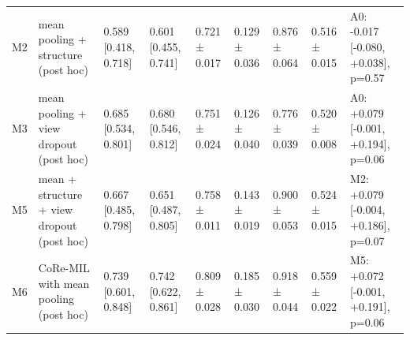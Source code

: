 \begin{table}
\begin{tabular}{lllllllll}
M2 & mean pooling + structure (post hoc) & 0.589 [0.418, 0.718] & 0.601 [0.455, 0.741] & 0.721 ± 0.017 & 0.129 ± 0.036 & 0.876 ± 0.064 & 0.516 ± 0.015 & A0: -0.017 [-0.080, +0.038], p=0.57 \\
M3 & mean pooling + view dropout (post hoc) & 0.685 [0.534, 0.801] & 0.680 [0.546, 0.812] & 0.751 ± 0.024 & 0.126 ± 0.040 & 0.776 ± 0.039 & 0.520 ± 0.008 & A0: +0.079 [-0.001, +0.194], p=0.06 \\
M5 & mean + structure + view dropout (post hoc) & 0.667 [0.485, 0.798] & 0.651 [0.487, 0.805] & 0.758 ± 0.011 & 0.143 ± 0.019 & 0.900 ± 0.053 & 0.524 ± 0.015 & M2: +0.079 [-0.004, +0.186], p=0.07 \\
M6 & CoRe-MIL with mean pooling (post hoc) & 0.739 [0.601, 0.848] & 0.742 [0.622, 0.861] & 0.809 ± 0.028 & 0.185 ± 0.030 & 0.918 ± 0.044 & 0.559 ± 0.022 & M5: +0.072 [-0.001, +0.191], p=0.06 \\
\bottomrule
\end{tabular}
\end{table}
